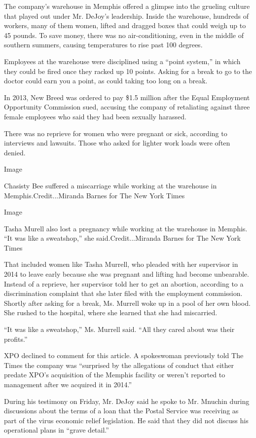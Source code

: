 The company's warehouse in Memphis offered a glimpse into the grueling
culture that played out under Mr. DeJoy's leadership. Inside the
warehouse, hundreds of workers, many of them women, lifted and dragged
boxes that could weigh up to 45 pounds. To save money, there was no
air-conditioning, even in the middle of southern summers, causing
temperatures to rise past 100 degrees.

Employees at the warehouse were disciplined using a ``point system,'' in
which they could be fired once they racked up 10 points. Asking for a
break to go to the doctor could earn you a point, as could taking too
long on a break.

In 2013, New Breed was ordered to pay \$1.5 million after the Equal
Employment Opportunity Commission sued, accusing the company of
retaliating against three female employees who said they had been
sexually harassed.

There was no reprieve for women who were pregnant or sick, according to
interviews and lawsuits. Those who asked for lighter work loads were
often denied.

Image

Chasisty Bee suffered a miscarriage while working at the warehouse in
Memphis.Credit...Miranda Barnes for The New York Times

Image

Tasha Murell also lost a pregnancy while working at the warehouse in
Memphis. ``It was like a sweatshop,'' she said.Credit...Miranda Barnes
for The New York Times

That included women like Tasha Murrell, who pleaded with her supervisor
in 2014 to leave early because she was pregnant and lifting had become
unbearable. Instead of a reprieve, her supervisor told her to get an
abortion, according to a discrimination complaint that she later filed
with the employment commission. Shortly after asking for a break, Ms.
Murrell woke up in a pool of her own blood. She rushed to the hospital,
where she learned that she had miscarried.

``It was like a sweatshop,'' Ms. Murrell said. ``All they cared about
was their profits.''

XPO declined to comment for this article. A spokeswoman previously told
The Times the company was ``surprised by the allegations of conduct that
either predate XPO's acquisition of the Memphis facility or weren't
reported to management after we acquired it in 2014.''

During his testimony on Friday, Mr. DeJoy said he spoke to Mr. Mnuchin
during discussions about the terms of a loan that the Postal Service was
receiving as part of the virus economic relief legislation. He said that
they did not discuss his operational plans in ``grave detail.''

